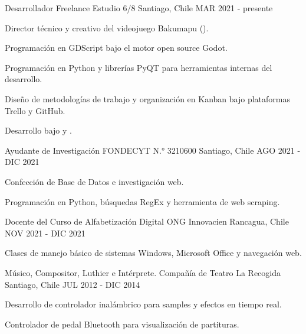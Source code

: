 

\begin{cventries}

  \cventry
    {Desarrollador Freelance} %
    {Estudio 6/8} %
    {Santiago, Chile} %
    {MAR 2021 - presente} %
    {
      \begin{cvitems} %
        \item {Director técnico y creativo del videojuego Bakumapu ().}
        \item {Programación en GDScript bajo el motor open source Godot.}
        \item {Programación en Python y librerías PyQT para herramientas internas del desarrollo.}
        \item {Diseño de metodologías de trabajo y organización en Kanban bajo plataformas Trello y GitHub.}
        \item {Desarrollo bajo  y .}
      \end{cvitems}
    }

  \cventry
    {Ayudante de Investigación} %
    {FONDECYT N.° 3210600} %
    {Santiago, Chile} %
    {AGO 2021 - DIC 2021} %
    {
      \begin{cvitems} %
        \item {Confección de Base de Datos e investigación web.}
        \item {Programación en Python, búsquedas RegEx y herramienta de web scraping.}
      \end{cvitems}
    }

  \cventry
    {Docente del Curso de Alfabetización Digital} %
    {ONG Innovacien} %
    {Rancagua, Chile} %
    {NOV 2021 - DIC 2021} %
    {
      \begin{cvitems} %
        \item {Clases de manejo básico de sistemas Windows, Microsoft Office y navegación web.}
      \end{cvitems}
    }

  \cventry
    {Músico, Compositor, Luthier e Intérprete.}
    {Compañía de Teatro La Recogida}
    {Santiago, Chile}
    {JUL 2012 - DIC 2014}
    {
      \begin{cvitems} %
        \item {Desarrollo de controlador  inalámbrico para samples y efectos en tiempo real.}
        \item {Controlador de pedal Bluetooth para visualización de partituras.}
      \end{cvitems}
    }   


\end{cventries}
